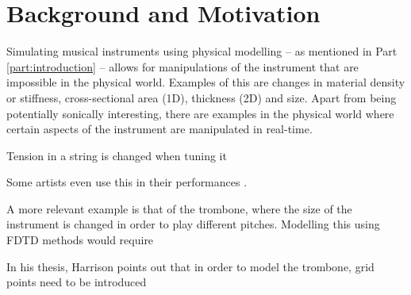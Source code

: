 \section{Background and Motivation}
Simulating musical instruments using physical modelling -- as mentioned in Part \ref{part:introduction} -- allows for manipulations of the instrument that are impossible in the physical world. Examples of this are changes in material density or stiffness, cross-sectional area (1D), thickness (2D) and size. Apart from being potentially sonically interesting, there are examples in the physical world where certain aspects of the instrument are manipulated in real-time.

Tension in a string is changed when tuning it

Some artists even use this in their performances \cite{Gomm2011}.

A more relevant example is that of the trombone, where the size of the instrument is changed in order to play different pitches. Modelling this using FDTD methods would require



In his thesis, Harrison points out that in order to model the trombone, grid points need to be introduced 